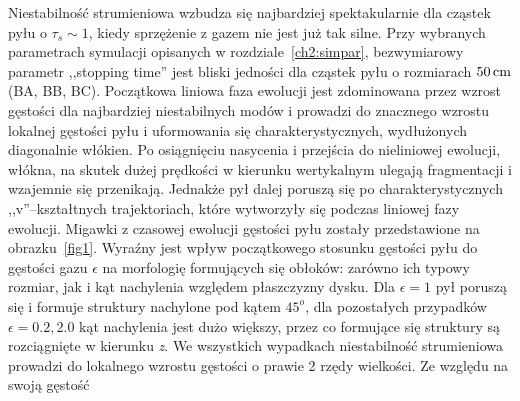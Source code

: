 Niestabilność strumieniowa wzbudza się najbardziej spektakularnie dla cząstek
pyłu o $\tau_s \sim 1$, kiedy sprzężenie z gazem nie jest już tak silne. Przy
wybranych parametrach symulacji opisanych w rozdziale~\ref{ch2:simpar},
bezwymiarowy parametr ,,stopping time'' jest bliski jedności dla cząstek pyłu o
rozmiarach $50\hbox{$\thinspace\textrm{cm}$}$ (BA, BB, BC). Początkowa liniowa faza ewolucji jest
zdominowana przez wzrost gęstości dla najbardziej niestabilnych modów i prowadzi
do znacznego wzrostu lokalnej gęstości pyłu i uformowania się
charakterystycznych, wydłużonych diagonalnie włókien. Po osiągnięciu nasycenia i
przejścia do nieliniowej ewolucji, włókna, na skutek dużej prędkości w kierunku
wertykalnym ulegają fragmentacji i wzajemnie się przenikają. Jednakże pył dalej
poruszą się po charakterystycznych ,,v''--kształtnych trajektoriach, które
wytworzyły się podczas liniowej fazy ewolucji. Migawki z czasowej ewolucji
gęstości pyłu zostały przedstawione na obrazku~\ref{fig1}. Wyraźny jest wpływ
początkowego stosunku gęstości pyłu do gęstości gazu $\epsilon$ na morfologię
formujących się obłoków: zarówno ich typowy rozmiar, jak i kąt nachylenia
względem płaszczyzny dysku. Dla $\epsilon = 1$ pył poruszą się i formuje
struktury nachylone pod kątem $45^o$, dla pozostałych przypadków $\epsilon=0.2,
2.0$ kąt nachylenia jest dużo większy, przez co formujące się struktury są
rozciągnięte w kierunku \emph{z}. We wszystkich wypadkach niestabilność
strumieniowa prowadzi do lokalnego wzrostu gęstości o prawie 2 rzędy wielkości.
Ze względu na swoją gęstość

